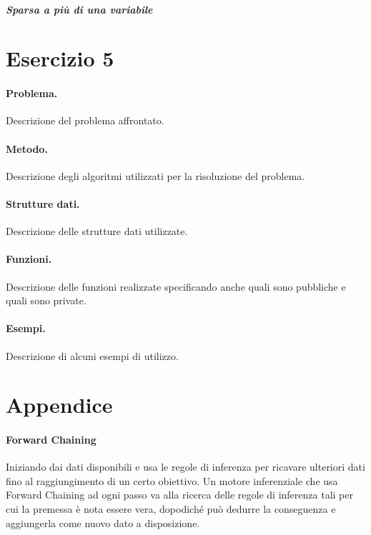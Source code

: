 \documentclass[12pt,twoside]{report}
\begin{document}
\subparagraph{Sparsa a più di una variabile}

\cleardoublepage


\section*{Esercizio 5}

\paragraph{Problema.} Descrizione del problema affrontato.

\paragraph{Metodo.} Descrizione degli algoritmi utilizzati per la risoluzione del problema.

\paragraph{Strutture dati.} Descrizione delle strutture dati utilizzate. 

\paragraph{Funzioni.} Descrizione delle funzioni realizzate specificando anche quali sono pubbliche e quali sono private.

\paragraph{Esempi.} Descrizione di alcuni esempi di utilizzo.

\cleardoublepage


\section*{Appendice}
\paragraph{Forward Chaining} Iniziando dai dati disponibili e usa le regole di inferenza per ricavare ulteriori dati fino al raggiungimento di un certo obiettivo. Un motore inferenziale che usa Forward Chaining ad ogni passo va alla ricerca delle regole di inferenza tali per cui la premessa è nota essere vera, dopodiché può dedurre la conseguenza e aggiungerla come nuovo dato a disposizione.
\end{document}
